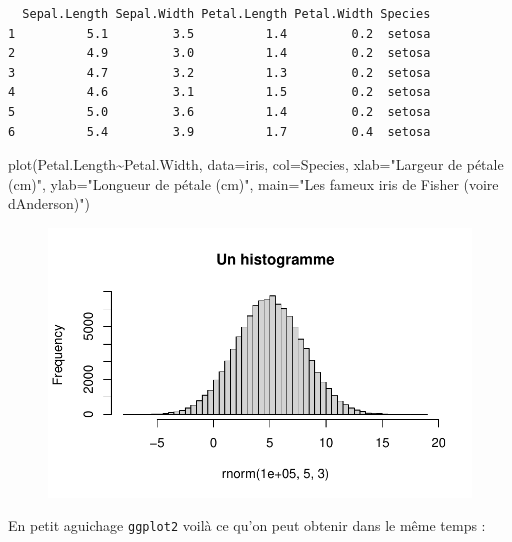 \documentclass[
  letterpaper,
  DIV=11,
  numbers=noendperiod]{scrreprt}
\newenvironment{Shaded}{\begin{snugshade}}{\end{snugshade}}
\newcommand{\AttributeTok}[1]{\textcolor[rgb]{0.40,0.45,0.13}{#1}}
\newcommand{\FunctionTok}[1]{\textcolor[rgb]{0.28,0.35,0.67}{#1}}
\newcommand{\NormalTok}[1]{\textcolor[rgb]{0.00,0.23,0.31}{#1}}
\newcommand{\SpecialCharTok}[1]{\textcolor[rgb]{0.37,0.37,0.37}{#1}}
\newcommand{\StringTok}[1]{\textcolor[rgb]{0.13,0.47,0.30}{#1}}
\begin{document}
\begin{verbatim}
  Sepal.Length Sepal.Width Petal.Length Petal.Width Species
1          5.1         3.5          1.4         0.2  setosa
2          4.9         3.0          1.4         0.2  setosa
3          4.7         3.2          1.3         0.2  setosa
4          4.6         3.1          1.5         0.2  setosa
5          5.0         3.6          1.4         0.2  setosa
6          5.4         3.9          1.7         0.4  setosa
\end{verbatim}

\begin{Shaded}
\begin{Highlighting}[]
\FunctionTok{plot}\NormalTok{(Petal.Length}\SpecialCharTok{\textasciitilde{}}\NormalTok{Petal.Width, }\AttributeTok{data=}\NormalTok{iris, }\AttributeTok{col=}\NormalTok{Species,}
     \AttributeTok{xlab=}\StringTok{"Largeur de pétale (cm)"}\NormalTok{, }\AttributeTok{ylab=}\StringTok{"Longueur de pétale (cm)"}\NormalTok{,}
     \AttributeTok{main=}\StringTok{"Les fameux iris de Fisher (voire d\textquotesingle{}Anderson)"}\NormalTok{)}
\end{Highlighting}
\end{Shaded}

\begin{figure}[H]

{\centering \includegraphics{premiers-pas_files/figure-pdf/unnamed-chunk-62-1.pdf}

}

\end{figure}

En petit aguichage \texttt{ggplot2} voilà ce qu'on peut obtenir dans le
même temps :
\end{document}
